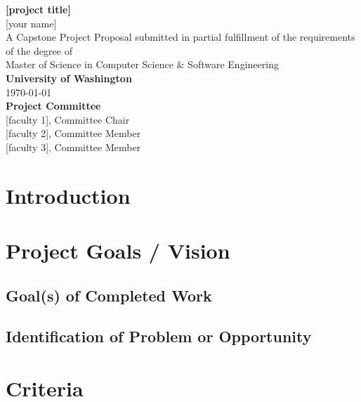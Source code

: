 \documentclass[12pt,a4paper]{article}
\begin{document}
\def\course{A Capstone Project Proposal
submitted in partial fulfillment of the
requirements of the degree of
}      %
\def\degree{Master of Science in Computer Science \& Software Engineering}
\def\thetitle{[project title]}               %
\def\date{\today}
\begin{center}
    {\Large\textbf{{\thetitle}}}\\[.5cm]
    {\Large{[your name]}}\\[3cm]
    
    {\Large{\course}}\\[.5cm]
    {\Large{\degree}}\\[3cm]
   
    {\color[RGB]{51, 0, 111}\Large{\textbf{University of Washington}}}\\[.5cm]
     {\date}\\[3cm]

    {\Large{\textbf{Project Committee}}}\\[.5cm]
     {[faculty 1], Committee Chair}\\[.5cm]
     {[faculty 2], Committee Member}\\[.5cm]
     {[faculty 3], Committee Member}\\[.5cm]
   
\end{center}
\thispagestyle{empty}
\pagebreak

\section{Introduction}

\section{Project Goals / Vision}
\subsection{Goal(s) of Completed Work}

\subsection{Identification of Problem or Opportunity}

\section{Criteria}
\end{document}
